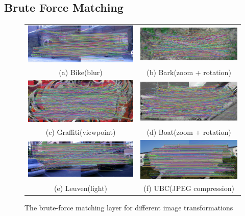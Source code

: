 \subsection {Brute Force Matching}
\begin{figure}[H]
\begin{tabular}{cc}
  \includegraphics[width=75mm]{figures/bike_brute_1_3} &  \includegraphics[width=75mm]{figures/barks_brute_1_3} \\
(a) Bike(blur) & (b) Bark(zoom + rotation) \\[6pt]
 \includegraphics[width=75mm]{figures/graffiti_brute_1_3} &  \includegraphics[width=75mm]{figures/boat_brute_1_3} \\
(c) Graffiti(viewpoint) & (d) Boat(zoom + rotation) \\[6pt]
 \includegraphics[width=75mm]{figures/leuven_brute_1_3} &  \includegraphics[width=75mm]{figures/ubc_brute_1_3} \\
(e) Leuven(light) & (f) UBC(JPEG compression) \\[6pt]
\end{tabular}
\caption{The brute-force matching layer for different image transformations}\label{fig:brute_force_matching}
\end{figure}

